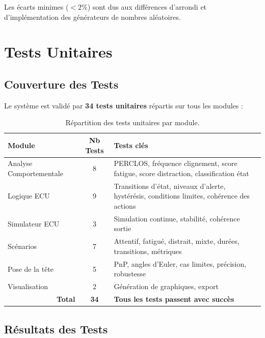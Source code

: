 Les écarts minimes ($< 2\%$) sont dus aux différences d'arrondi et d'implémentation des générateurs de nombres aléatoires.

\section{Tests Unitaires}

\subsection{Couverture des Tests}

Le système est validé par \textbf{34 tests unitaires} répartis sur tous les modules :

\begin{table}[H]
\centering
\caption{Répartition des tests unitaires par module.}
\label{tab:unit_tests}
\renewcommand{\arraystretch}{1.3}
\begin{tabularx}{\textwidth}{|l|c|X|}
\hline
\rowcolor{stellantisblue!15}
\textbf{Module} & \textbf{Nb Tests} & \textbf{Tests clés} \\
\hline
Analyse Comportementale & 8 & PERCLOS, fréquence clignement, score fatigue, score distraction, classification état \\
\hline
Logique ECU & 9 & Transitions d'état, niveaux d'alerte, hystérésis, conditions limites, cohérence des actions \\
\hline
Simulateur ECU & 3 & Simulation continue, stabilité, cohérence sortie \\
\hline
Scénarios & 7 & Attentif, fatigué, distrait, mixte, durées, transitions, métriques \\
\hline
Pose de la tête & 5 & PnP, angles d'Euler, cas limites, précision, robustesse \\
\hline
Visualisation & 2 & Génération de graphiques, export \\
\hline
\multicolumn{1}{|r|}{\textbf{Total}} & \textbf{34} & \textbf{Tous les tests passent avec succès} \\
\hline
\end{tabularx}
\end{table}

\subsection{Résultats des Tests}

